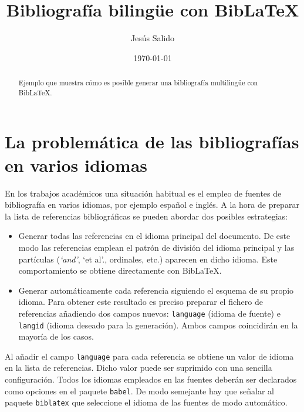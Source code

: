 \documentclass[11pt,a4paper]{article}
\author{Jesús Salido}
\title{Bibliografía bilingüe con Bib\LaTeX{}}
\date{\today}
\begin{document}
\maketitle


\begin{abstract}
Ejemplo que muestra cómo es posible generar una bibliografía multilingüe con Bib\LaTeX.
\end{abstract}


\section{La problemática de las bibliografías en varios idiomas}
En los trabajos académicos una situación habitual es el empleo de fuentes de bibliografía en varios idiomas, por ejemplo español e inglés. A la hora de preparar la lista de referencias bibliográficas se pueden abordar dos posibles estrategias:
\begin{itemize}
	\item Generar todas las referencias en el idioma principal del documento. De este modo las referencias emplean el patrón de división del idioma principal y las partículas (\emph{`and'}, `et al'., ordinales, etc.) aparecen en dicho idioma. Este comportamiento se obtiene directamente con Bib\LaTeX.
	
	\item Generar automáticamente cada referencia siguiendo el esquema de su propio idioma. Para obtener este resultado es preciso preparar el fichero de referencias añadiendo dos campos nuevos: \texttt{language} (idioma de fuente) e \texttt{langid} (idioma deseado para la generación). Ambos campos coincidirán en la mayoría de los casos.
\end{itemize}

Al añadir el campo \texttt{language} para cada referencia se obtiene un valor de idioma en la lista de referencias. Dicho valor puede ser suprimido con una sencilla configuración. Todos los idiomas empleados en las fuentes deberán ser declarados como opciones en el paquete \texttt{babel}. De modo semejante hay que señalar al paquete \texttt{biblatex} que seleccione el idioma de las fuentes de modo automático.


\nocite{*} %
\printbibliography[title=Bibliografía]
\end{document}
